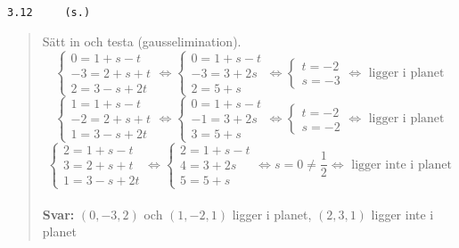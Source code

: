 \documentclass[a4paper]{article}
\newcommand{\tskcol}[1]{\textcolor{tskcol}{#1}}
\begin{document}
\pagebreak
\texttt{\tskcol{3.12~~~~ (s.)}}
\begin{quotation}
	\noindent
	Sätt in och testa (gausselimination).
	\[\begin{cases}
	0=1+s-t \\
	-3=2+s+t \\
	2=3-s+2t
	\end{cases} \Leftrightarrow
	\begin{cases}
	0=1+s-t \\
	-3=3+2s \\
	2=5+s
	\end{cases} \Leftrightarrow
	\begin{cases}
	t=-2 \\
	s=-3
	\end{cases} \Leftrightarrow
	\text{ ligger i planet}\]
	\[\begin{cases}
	1=1+s-t \\
	-2=2+s+t \\
	1=3-s+2t
	\end{cases} \Leftrightarrow
	\begin{cases}
	0=1+s-t \\
	-1=3+2s \\
	3=5+s
	\end{cases} \Leftrightarrow
	\begin{cases}
	t=-2 \\
	s=-2
	\end{cases} \Leftrightarrow
	\text{ ligger i planet}\]
	\[\begin{cases}
	2=1+s-t \\
	3=2+s+t \\
	1=3-s+2t
	\end{cases} \Leftrightarrow
	\begin{cases}
	2=1+s-t \\
	4=3+2s \\
	5=5+s
	\end{cases} \Leftrightarrow
	s=0 \neq \frac{1}{2} \Leftrightarrow
	\text{ ligger inte i planet}\]
	\\
	\textbf{Svar:} $(0,-3,2)$ och $(1,-2,1)$ ligger i planet, $(2,3,1)$ ligger inte i planet
\end{quotation}
\end{document}
